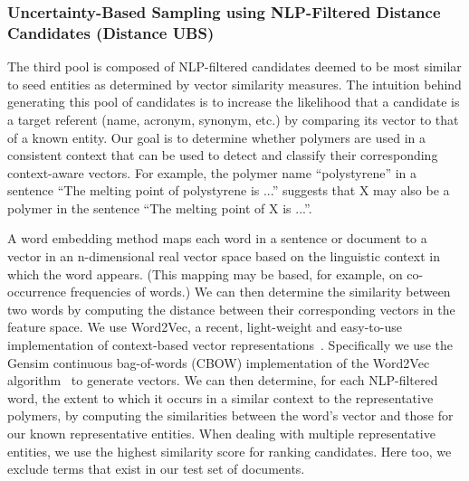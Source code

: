 \subsubsection{Uncertainty-Based Sampling using NLP-Filtered Distance Candidates (Distance UBS)}
The third pool is composed of NLP-filtered candidates deemed to be most similar to seed entities as determined by vector similarity measures.
The intuition behind generating this pool of candidates is to increase the likelihood that a candidate is a target referent (name, acronym, synonym, etc.) by comparing its vector to that of a known entity.
Our goal is to determine whether polymers are used in a consistent context that can be used to detect and classify their corresponding context-aware vectors.
For example, the polymer name ``polystyrene'' in a sentence ``The
melting point of polystyrene is ...'' suggests that X may also be a polymer in the
sentence ``The melting point of X is ...''.


A word embedding method  
maps each word
in a sentence or document to a vector in an n-dimensional real vector space
based on the linguistic context in which the word appears. (This mapping may
be based, for example, on co-occurrence frequencies of words.) 
We can then
determine the similarity between two words by computing the distance between
their corresponding vectors in the feature space.
We use Word2Vec, a recent, light-weight and easy-to-use implementation of context-based vector representations~\cite{mikolov2013efficient,mikolov2013distributed}.
Specifically we use the Gensim continuous bag-of-words
(CBOW) implementation of the Word2Vec
algorithm~\cite{rehurek2010software} to generate vectors.
We can then determine, for each NLP-filtered word, the extent to which it occurs
in a similar context to the representative polymers, by computing the similarities
between the word's vector and those for our known representative entities. 
When dealing with multiple representative entities, we use the highest similarity score for ranking candidates.
Here too, we exclude terms that exist in our test set of documents.

